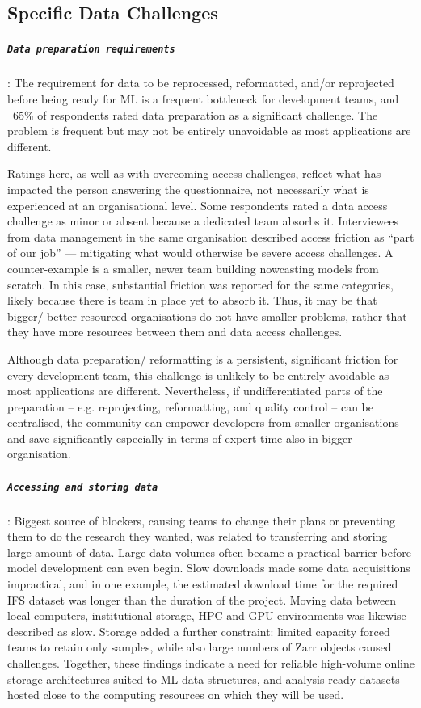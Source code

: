 \documentclass[acmtog,nonacm]{acmart}
\begin{document}
\subsection{Specific Data Challenges}
\label{sec:subsection}

\subparagraph{\texttt{Data preparation requirements}}
:\newline
The requirement for data to be reprocessed, reformatted, and/or reprojected before being ready for ML is a frequent bottleneck for development teams, and ~65\% of respondents rated data preparation as a significant challenge. The problem is frequent but may not be entirely unavoidable as most applications are different. 

Ratings here, as well as with overcoming access-challenges, reflect what has impacted the person answering the questionnaire, not necessarily what is experienced at an organisational level. Some respondents rated a data access challenge as minor or absent because a dedicated team absorbs it. Interviewees from data management in the same organisation described access friction as “part of our job” — mitigating what would otherwise be severe access challenges. A counter-example is a smaller, newer team building nowcasting models from scratch. In this case, substantial friction was reported for the same categories, likely because there is team in place yet to absorb it. Thus, it may be that bigger/ better-resourced organisations do not have smaller problems, rather that they have more resources between them and data access challenges.

Although data preparation/ reformatting is a persistent, significant friction for every development team, this challenge is unlikely to be entirely avoidable as most applications are different. Nevertheless, if undifferentiated parts of the preparation – e.g. reprojecting, reformatting, and quality control – can be centralised, the community can empower developers from smaller organisations and save significantly especially in terms of expert time also in bigger organisation.

\subparagraph{\texttt{Accessing and storing data}}
:\newline
Biggest source of blockers, causing teams to change their plans or preventing them to do the research they wanted, was related to transferring and storing large amount of data. Large data volumes often became a practical barrier before model development can even begin. Slow downloads made some data acquisitions impractical, and in one example, the estimated download time for the required IFS dataset was longer than the duration of the project. Moving data between local computers, institutional storage, HPC and GPU environments was likewise described as slow. Storage added a further constraint: limited capacity forced teams to retain only samples, while also large numbers of Zarr objects caused challenges. Together, these findings indicate a need for reliable high-volume online storage architectures suited to ML data structures, and analysis-ready datasets hosted close to the computing resources on which they will be used.
\end{document}
